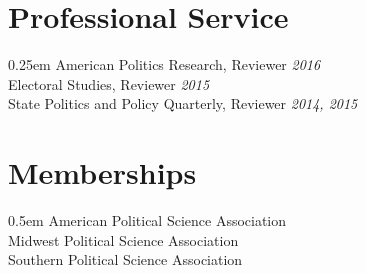\documentclass[article,11pt,oneside]{memoir}
\begin{document}
\bigskip{}

\section{Professional Service}{0.25em}
American Politics Research, Reviewer \hfill \emph{2016}\\
Electoral Studies, Reviewer \hfill \emph{2015}\\
State Politics and Policy Quarterly, Reviewer \hfill \emph{2014, 2015} \\

\section{Memberships}{0.5em}
American Political Science Association \\
Midwest Political Science Association \\
Southern Political Science Association \\
\end{document}
